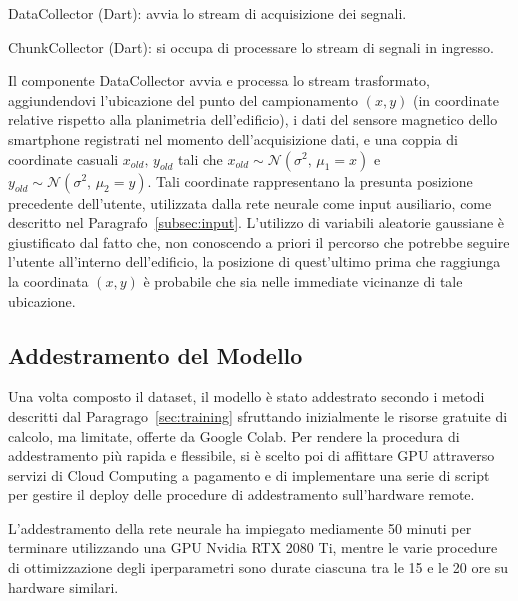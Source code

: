 \begin{listing}[htp]
	\caption{DataCollector (Dart): avvia lo stream di acquisizione dei segnali.}
  \label{code:data-collector}
\end{listing}

\begin{listing}[htp]
	\caption{ChunkCollector (Dart): si occupa di processare lo stream di segnali in
    ingresso.}
  \label{code:chunk-collector}
\end{listing}

Il componente DataCollector avvia e processa lo stream trasformato,
aggiundendovi l'ubicazione del punto del campionamento \((x, y)\) (in coordinate
relative rispetto alla planimetria dell'edificio), i dati del sensore magnetico
dello smartphone registrati nel momento dell'acquisizione dati, e una coppia di
coordinate casuali \(x_{old}, \, y_{old}\) tali che 
\( x_{old} \sim \mathcal{N}(\sigma^2, \, \mu_1 = x) \) e 
\( y_{old} \sim \mathcal{N}(\sigma^2, \, \mu_2 = y) \). Tali coordinate
rappresentano la presunta posizione precedente dell'utente, utilizzata dalla
rete neurale come input ausiliario, come descritto nel
Paragrafo~\ref{subsec:input}. L'utilizzo di variabili aleatorie gaussiane è
giustificato dal fatto che, non conoscendo a priori il percorso che potrebbe
seguire l'utente all'interno dell'edificio, la posizione di quest'ultimo prima
che raggiunga la coordinata \((x, y)\) è probabile che sia nelle immediate
vicinanze di tale ubicazione.

\subsection{Addestramento del Modello}
Una volta composto il dataset, il modello è stato addestrato secondo i metodi
descritti dal Paragrago~\ref{sec:training} sfruttando inizialmente le risorse
gratuite di calcolo, ma limitate, offerte da Google Colab. Per rendere la
procedura di addestramento più rapida e flessibile, si è scelto poi di
affittare GPU attraverso servizi di Cloud Computing a pagamento e di
implementare una serie di script per gestire il deploy delle procedure di
addestramento sull'hardware remote.

L'addestramento della rete neurale ha impiegato mediamente 50 minuti per
terminare utilizzando una GPU Nvidia RTX 2080 Ti, mentre le varie procedure di
ottimizzazione degli iperparametri sono durate ciascuna tra le 15 e le 20 ore
su hardware similari.
